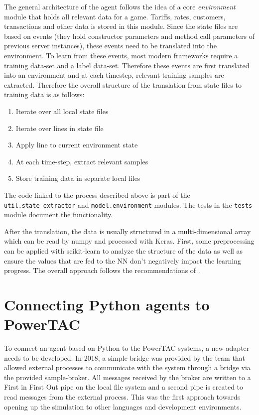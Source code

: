 The general architecture of the agent follows the idea of a core \emph{environment} module that holds all relevant data
for a game. Tariffs, rates, customers, transactions and other data is stored in this module. Since the state files are
based on events (they hold constructor parameters and method call parameters of previous server instances), these events
need to be translated into the environment. To learn from these events, most modern frameworks require a training
data-set and a label data-set. Therefore these events are first translated into an environment and at each timestep,
relevant training samples are extracted. Therefore the overall structure of the translation from state files to training
data is as follows:

\begin{enumerate} \item Iterate over all local state files \item Iterate over lines in state file \item Apply line to
current environment state \item At each time-step, extract relevant samples \item Store training data in separate local
files \end{enumerate}

The code linked to the process described above is part of the \texttt{util.state\_extractor} and
\texttt{model.environment} modules. The tests in the \texttt{tests} module document the functionality.

After the translation, the data is usually structured in a multi-dimensional array which can be read by numpy and
processed with Keras. First, some preprocessing can be applied with scikit-learn to analyze the structure of the data as
well as ensure the values that are fed to the \ac {NN} don't negatively impact the learning progress. The overall
approach follows the recommendations of \citep{Goodfellow-et-al-2016}.  


\section{Connecting Python agents to PowerTAC}%
\label{sec:connecting_python_agents_to_powertac}



To connect an agent based on Python to the \ac{PowerTAC} systems, a new adapter needs to be developed. In 2018, a simple
bridge was provided by the team that allowed external processes to communicate with the system through a bridge via the
provided sample-broker. All messages received by the broker are written to a First in First Out pipe on the local file
system and a second pipe is created to read messages from the external process. This was the first approach towards
opening up the simulation to other languages and development environments. 

